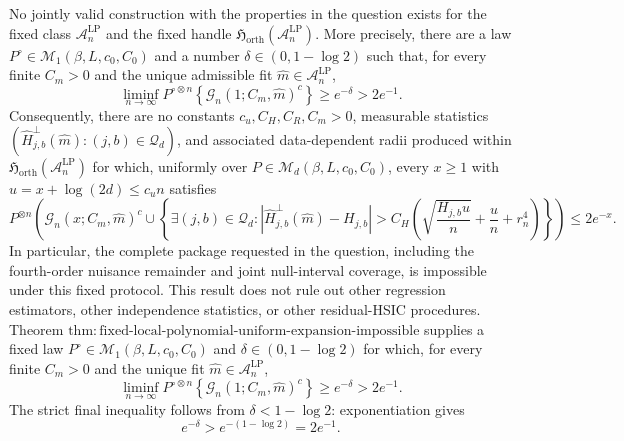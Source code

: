 No jointly valid construction with the properties in the question exists for the fixed class \(\mathcal A_n^{\mathrm{LP}}\) and the fixed handle \(\mathfrak H_{\mathrm{orth}}(\mathcal A_n^{\mathrm{LP}})\). More precisely, there are a law \(P^\circ\in\mathcal M_1(\beta,L,c_0,C_0)\) and a number \(\delta\in(0,1-\log 2)\) such that, for every finite \(C_m>0\) and the unique admissible fit \(\widehat m\in\mathcal A_n^{\mathrm{LP}}\),
\[
\liminf_{n\to\infty}P^{\circ\otimes n}\!\left\{\mathcal G_n(1;C_m,\widehat m)^c\right\}
\ge e^{-\delta}>2e^{-1}.
\]
Consequently, there are no constants \(c_u,C_H,C_R,C_m>0\), measurable statistics \((\widehat H^\perp_{j,b}(\widehat m):(j,b)\in\mathcal Q_d)\), and associated data-dependent radii produced within \(\mathfrak H_{\mathrm{orth}}(\mathcal A_n^{\mathrm{LP}})\) for which, uniformly over \(P\in\mathcal M_d(\beta,L,c_0,C_0)\), every \(x\ge1\) with \(u=x+\log(2d)\le c_u n\) satisfies
\[
P^{\otimes n}\!\left(
\mathcal G_n(x;C_m,\widehat m)^c
\cup
\left\{\exists(j,b)\in\mathcal Q_d:
\left|\widehat H^\perp_{j,b}(\widehat m)-H_{j,b}\right|
>C_H\left(\sqrt{\frac{H_{j,b}u}{n}}+\frac{u}{n}+r_n^4\right)
\right\}
\right)
\le 2e^{-x}.
\]
In particular, the complete package requested in the question, including the fourth-order nuisance remainder and joint null-interval coverage, is impossible under this fixed protocol. This result does not rule out other regression estimators, other independence statistics, or other residual-HSIC procedures.
Theorem \(\mathrm{thm:fixed\text{-}local\text{-}polynomial\text{-}uniform\text{-}expansion\text{-}impossible}\) supplies a fixed law \(P^\circ\in\mathcal M_1(\beta,L,c_0,C_0)\) and \(\delta\in(0,1-\log 2)\) for which, for every finite \(C_m>0\) and the unique fit \(\widehat m\in\mathcal A_n^{\mathrm{LP}}\),
\[
\liminf_{n\to\infty}P^{\circ\otimes n}\!\left\{\mathcal G_n(1;C_m,\widehat m)^c\right\}
\ge e^{-\delta}>2e^{-1}.
\]
The strict final inequality follows from \(\delta<1-\log 2\): exponentiation gives
\[
e^{-\delta}>e^{-(1-\log 2)}=2e^{-1}.
\]

